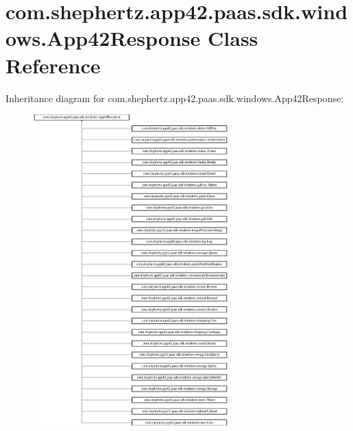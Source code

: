 \hypertarget{classcom_1_1shephertz_1_1app42_1_1paas_1_1sdk_1_1windows_1_1_app42_response}{\section{com.\+shephertz.\+app42.\+paas.\+sdk.\+windows.\+App42\+Response Class Reference}
\label{classcom_1_1shephertz_1_1app42_1_1paas_1_1sdk_1_1windows_1_1_app42_response}
}
Inheritance diagram for com.\+shephertz.\+app42.\+paas.\+sdk.\+windows.\+App42\+Response\+:\begin{figure}[H]
\begin{center}
\leavevmode
\includegraphics[height=12.000000cm]{classcom_1_1shephertz_1_1app42_1_1paas_1_1sdk_1_1windows_1_1_app42_response}
\end{center}
\end{figure}
